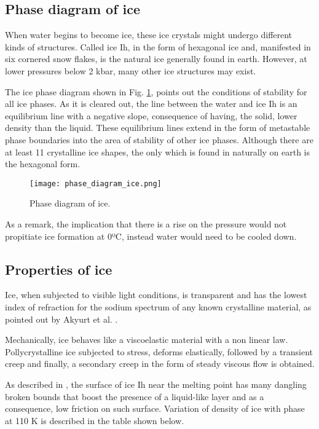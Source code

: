 \subsection{Phase diagram of ice}
\setlength{\parindent}{0.5cm} When water begins to become ice, these ice crystals might undergo different kinds of structures. Called ice Ih, in the form of hexagonal ice and, manifested in six cornered snow flakes, is the natural ice generally found in earth. However, at lower pressures below 2 kbar, many other ice structures may exist.

\noindent The ice phase diagram shown in Fig. \ref{1.6fig}, points out the conditions of stability for all ice phases. As it is cleared out, the line between the water and ice Ih is an equilibrium line with a negative slope, consequence of having, the solid, lower density than the liquid. These equilibrium lines extend in the form of metastable phase boundaries into the area of stability of other ice phases.
Although there are at least 11 crystalline ice shapes, the only which is found in naturally on earth is the hexagonal form. 
\begin{figure}[h!]
	\centering
	\texttt{[image: phase\_diagram\_ice.png]}
	\caption{Phase diagram of ice.} 
	\label{1.6fig}
\end{figure}
\newline
\noindent As a remark, the implication that there is a rise on the pressure would not propitiate ice formation at 0ºC, instead water would need to be cooled down.
\subsection{Properties of ice}
\setlength{\parindent}{0.5cm} Ice, when subjected to visible light conditions, is transparent and has the lowest index of refraction for the sodium spectrum of any known crystalline material, as pointed out by Akyurt et al. \cite{akyurt_zaki_habeebullah_2002}.

\noindent Mechanically, ice behaves like a viscoelastic material with a non linear law. Pollycrystalline ice subjected to stress, deforms elastically, followed by a transient creep and finally, a secondary creep in the form of steady viscous flow is obtained.

\noindent As described in \cite{akyurt_zaki_habeebullah_2002}, the surface of ice Ih near the melting point has many dangling broken bounds that boost the presence of a liquid-like layer and as a consequence, low friction on such surface. Variation of density of ice with phase at 110 K is described in the table shown below.

